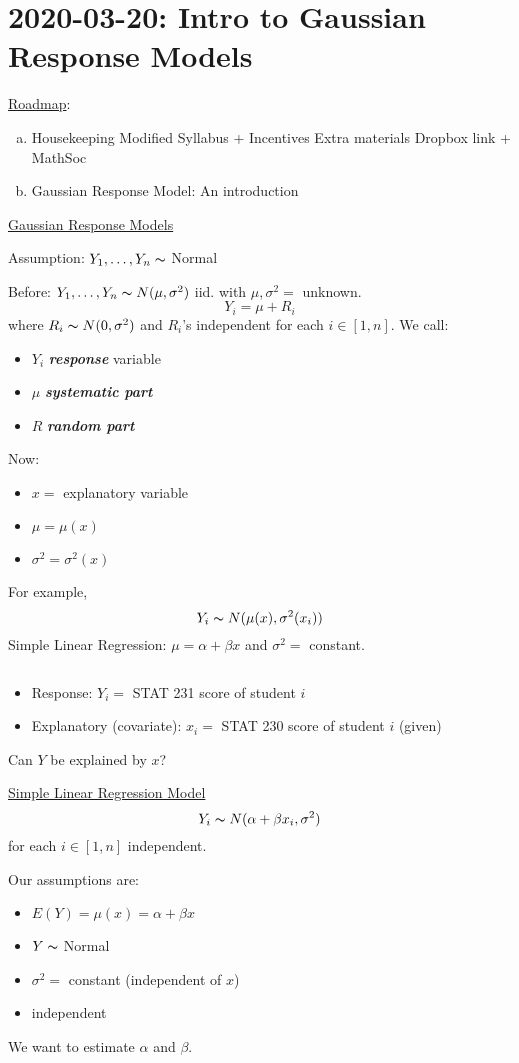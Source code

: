 \section{2020-03-20: Intro to Gaussian Response Models}
\underline{Roadmap}:
\begin{enumerate}[(a)]
    \item Housekeeping
          \subitem Modified Syllabus + Incentives
          \subitem Extra materials
          \subitem Dropbox link + MathSoc
    \item Gaussian Response Model: An introduction
\end{enumerate}
\underline{Gaussian Response Models}

Assumption: $ Y_1,\ldots ,Y_n \thicksim $ Normal

Before: $ Y_1,\ldots ,Y_n \thicksim N(\mu,\sigma^2) $ iid.
with $ \mu,\sigma^2= $ unknown.
\[ Y_i=\mu+R_i \]
where $ R_i \thicksim N(0,\sigma^2) $ and $ R_i $'s independent
for each $ i\in[1,n] $. We call:
\begin{itemize}
    \item $ Y_i $ \textbf{\emph{response}} variable
    \item $ \mu $ \textbf{\emph{systematic part}}
    \item $ R $ \textbf{\emph{random part}}
\end{itemize}

Now:
\begin{itemize}
    \item $ x= $ explanatory variable
    \item $ \mu=\mu(x) $
    \item $ \sigma^2=\sigma^2(x) $
\end{itemize}
For example,
\[ Y_i \thicksim N(\mu(x),\sigma^2(x_i)) \]
Simple Linear Regression: $ \mu=\alpha+\beta x $
and $ \sigma^2 = $ constant.

\begin{exbox}
    \begin{example} $ \; $
        \begin{itemize}
            \item Response: $ Y_i= $ STAT 231 score of student $ i $
            \item Explanatory (covariate): $ x_i= $ STAT 230 score of student $ i $
                  (given)
        \end{itemize}
        Can $ Y $ be explained by $ x $?

        \underline{Simple Linear Regression Model}
        \[ Y_i \thicksim N(\alpha+\beta x_i,\sigma^2) \]
        for each $ i\in[1,n] $ independent.

        Our assumptions are:
        \begin{itemize}
            \item $ E(Y)=\mu(x)=\alpha+\beta x $
            \item $ Y \thicksim $ Normal
            \item $ \sigma^2= $ constant (independent of $ x $)
            \item independent
        \end{itemize}
        We want to estimate $ \alpha $ and $ \beta $.
    \end{example}
\end{exbox}
